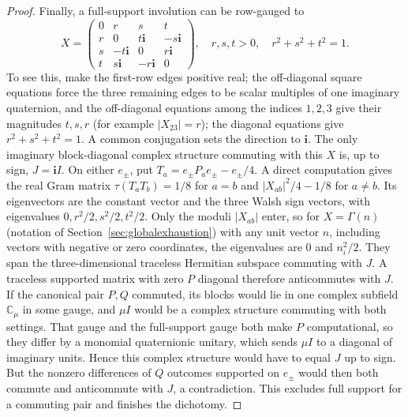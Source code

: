\documentclass[11pt]{article}
\begin{document}
\begin{proof}
Finally, a full-support involution can be row-gauged to
\begin{equation}\label{eq:fullcoarsenormal}
 X=\begin{pmatrix}
 0&r&s&t\\r&0&t\mathbf i&-s\mathbf i\\
 s&-t\mathbf i&0&r\mathbf i\\
 t&s\mathbf i&-r\mathbf i&0
 \end{pmatrix},\quad r,s,t>0,\quad r^2+s^2+t^2=1.
\end{equation}
To see this, make the first-row edges positive real; the off-diagonal
square equations force the three remaining edges to be scalar multiples
of one imaginary quaternion, and the off-diagonal equations among the
indices $1,2,3$ give their magnitudes $t,s,r$ (for example
$|X_{23}|=r$); the diagonal equations give $r^2+s^2+t^2=1$.
A common conjugation sets the direction to $\mathbf i$.
The only imaginary block-diagonal complex structure commuting with this
$X$ is, up to sign, $J=\mathbf i I$.
On either $e_\pm$, put $T_a=e_\pm P_a e_\pm-e_\pm/4$. A direct
computation gives the real Gram matrix $\tau(T_aT_b)=1/8$ for $a=b$ and
$|X_{ab}|^2/4-1/8$ for $a\neq b$. Its eigenvectors are the constant vector
and the three Walsh sign vectors, with eigenvalues $0,r^2/2,s^2/2,t^2/2$.
Only the moduli $|X_{ab}|$ enter, so for $X=\Gamma(n)$ (notation of
Section~\ref{sec:globalexhaustion}) with any unit vector $n$, including
vectors with negative or zero coordinates, the eigenvalues are $0$ and
$n_i^2/2$. They span the three-dimensional traceless
Hermitian subspace commuting with $J$. A traceless supported matrix
with zero $P$ diagonal therefore anticommutes with $J$.
If the canonical pair $P,Q$ commuted, its blocks would lie in one complex
subfield $\mathbb C_\mu$ in some gauge, and $\mu I$ would be a complex
structure commuting with both settings. That gauge and the full-support
gauge both make $P$ computational, so they differ by a monomial
quaternionic unitary, which sends $\mu I$ to a diagonal of imaginary
units. Hence this complex structure would have to equal $J$ up to sign. But the
nonzero differences of $Q$ outcomes supported on $e_\pm$ would then
both commute and anticommute with $J$, a contradiction.
This excludes full support for a commuting pair and finishes the dichotomy.
\end{proof}
\end{document}
